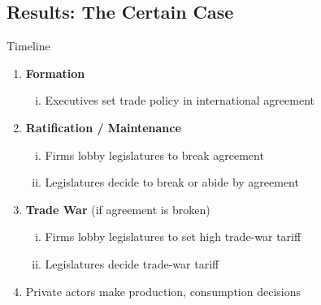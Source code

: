 \documentclass[handout]{beamer}
\begin{document}
\subsection{Results: The Certain Case}
\begin{frame}{Timeline}
\begin{enumerate}
	\item \textbf{Formation}
		\begin{enumerate}[i.]
			\item Executives set trade policy in international agreement
		\end{enumerate}
	\item \textbf{Ratification / Maintenance}
		\begin{enumerate}[i.]
			\item Firms lobby legislatures to break agreement
			\item Legislatures decide to break or abide by agreement
		\end{enumerate}
	\item {\color{gray} \textbf{Trade War} (if agreement is broken)}
		\begin{enumerate}[i.]
			\item {\color{gray} Firms lobby legislatures to set high trade-war tariff}
			\item {\color{gray} Legislatures decide trade-war tariff}
		\end{enumerate}
	\item {\color{gray} Private actors make production, consumption decisions}
\end{enumerate}
\end{frame}

\end{document}

